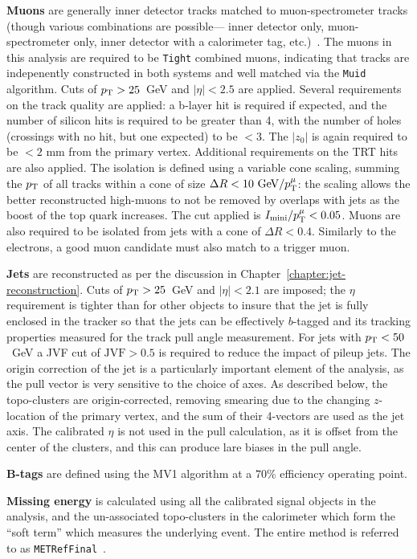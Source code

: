 \textbf{Muons} are generally inner detector tracks matched to muon-spectrometer tracks (though various combinations are possible--- inner detector only, muon-spectrometer only, inner detector with a calorimeter tag, etc.)~\cite{Aad:2014rra}. The muons in this analysis are required to be \texttt{Tight} combined muons, indicating that tracks are indepenently constructed in both systems and well matched via the \texttt{Muid} algorithm. Cuts of $p_{\text{T}} > 25$~GeV and $|\eta|<2.5$ are applied. Several requirements on the track quality are applied: a b-layer hit is required if expected, and the number of silicon hits is required to be greater than 4, with the number of holes (crossings with no hit, but one expected) to be $< 3$. The $|z_0|$ is again required to be $< 2$ mm from the primary vertex. Additional requirements on the TRT hits are also applied. The isolation is defined using a variable cone scaling, summing the $p_{\text{T}}$ of all tracks within a cone of size $\Delta R < 10~\mathrm{GeV} / p_{\text{T}}^{\mu}$: the scaling allows the better reconstructed high-\pt muons to not be removed by overlaps with jets as the boost of the top quark increases. The cut applied is $I_\mathrm{mini} / p_{\text{T}}^{\mu} < 0.05 $.  Muons are also required to be isolated from jets with a cone of $\Delta R < 0.4$. Similarly to the electrons, a good muon candidate must also match to a trigger muon.

\textbf{Jets} are reconstructed as per the discussion in Chapter~\ref{chapter:jet-reconstruction}. Cuts of $p_{\text{T}} > 25$~GeV and $|\eta| < 2.1$ are imposed; the $\eta$ requirement is tighter than for other objects to insure that the jet is fully enclosed in the tracker so that the jets can be effectively $b$-tagged and its tracking properties measured for the track pull angle measurement. For jets with $p_{\text{T}} < 50$~GeV a JVF cut of $\mathrm{JVF} > 0.5$ is required to reduce the impact of pileup jets. The origin correction of the jet is a particularly important element of the analysis, as the pull vector is very sensitive to the choice of axes. As described below, the topo-clusters are origin-corrected, removing smearing due to the changing $z$-location of the primary vertex, and the sum of their 4-vectors are used as the jet axis. The calibrated $\eta$ is not used in the pull calculation, as it is offset from the center of the clusters, and this can produce lare biases in the pull angle.

\textbf{B-tags} are defined using the MV1 algorithm at a $70\%$ efficiency operating point.

\textbf{Missing energy} is calculated using all the calibrated signal objects in the analysis, and the un-associated topo-clusters in the calorimeter which form the ``soft term'' which measures the underlying event. The entire method is referred to as \texttt{METRefFinal}~\cite{Aad:2012re,ATLAS-CONF-2013-082,ATLAS-CONF-2014-019}.


